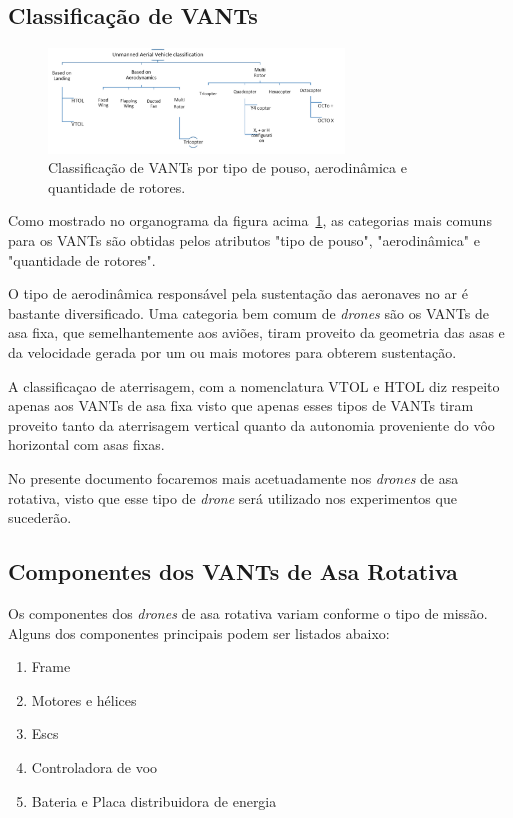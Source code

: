 \documentclass[12pt,a4paper,oneside]{book}
\begin{document}
\subsection{Classificação de VANTs}

\begin{figure}[!htbp]
  \centering
  \includegraphics[width=0.7\textwidth]{Images/introducao/drone_classification.png}
  \caption{Classificação de VANTs por tipo de pouso, aerodinâmica e quantidade de rotores.}
  \label{fig:drone_classification.png}
\end{figure}

Como mostrado no organograma da figura acima~\ref{fig:drone_classification.png}, as categorias mais comuns para os VANTs são obtidas pelos atributos "tipo de pouso", "aerodinâmica" e "quantidade de rotores".

O tipo de aerodinâmica responsável pela sustentação das aeronaves no ar é bastante diversificado. Uma categoria bem comum de \textit{drones} são os VANTs de asa fixa, que semelhantemente aos aviões, tiram proveito da geometria das asas e da velocidade gerada por um ou mais motores para obterem sustentação. 

A classificaçao de aterrisagem, com a nomenclatura VTOL e HTOL diz respeito apenas aos VANTs de asa fixa visto que apenas esses tipos de VANTs tiram proveito tanto da aterrisagem vertical quanto da autonomia proveniente do vôo horizontal com asas fixas. 

No presente documento focaremos mais acetuadamente nos \textit{drones} de asa rotativa, visto que esse tipo de \textit{drone} será utilizado nos experimentos que sucederão.

\subsection{Componentes dos VANTs de Asa Rotativa}

Os componentes dos \textit{drones} de asa rotativa variam conforme o tipo de missão. Alguns dos componentes principais podem ser listados abaixo:

\begin{enumerate}
  \item Frame
  \item Motores e hélices
  \item Escs
  \item Controladora de voo
  \item Bateria e Placa distribuidora de energia
\end{enumerate}
\end{document}
